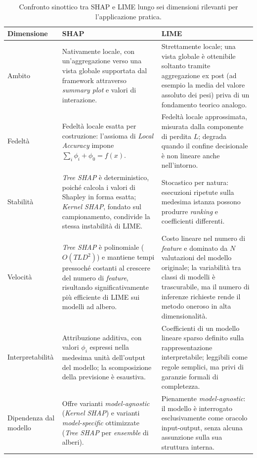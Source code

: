 \begin{table}[htbp]
\centering
\small
\caption{Confronto sinottico tra SHAP e LIME lungo sei dimensioni rilevanti per l'applicazione pratica.}
\label{tab:shap-lime}
\begin{tabular}{@{}p{2.6cm}p{5.3cm}p{5.3cm}@{}}
\toprule
\textbf{Dimensione} & \textbf{SHAP} & \textbf{LIME} \\
\midrule
Ambito & Nativamente locale, con un'aggregazione verso una vista globale supportata dal framework attraverso \textit{summary plot} e valori di interazione. & Strettamente locale; una vista globale è ottenibile soltanto tramite aggregazione ex post (ad esempio la media del valore assoluto dei pesi) priva di un fondamento teorico analogo. \\
\addlinespace
Fedeltà & Fedeltà locale esatta per costruzione: l'assioma di \textit{Local Accuracy} impone $\sum_i \phi_i + \phi_0 = f(x)$. & Fedeltà locale approssimata, misurata dalla componente di perdita $L$; degrada quando il confine decisionale è non lineare anche nell'intorno. \\
\addlinespace
Stabilità & \textit{Tree SHAP} è deterministico, poiché calcola i valori di Shapley in forma esatta; \textit{Kernel SHAP}, fondato sul campionamento, condivide la stessa instabilità di LIME. & Stocastico per natura: esecuzioni ripetute sulla medesima istanza possono produrre \textit{ranking} e coefficienti differenti. \\
\addlinespace
Velocità & \textit{Tree SHAP} è polinomiale ($O(TLD^2)$) e mantiene tempi pressoché costanti al crescere del numero di \textit{feature}, risultando significativamente più efficiente di LIME sui modelli ad albero. & Costo lineare nel numero di \textit{feature} e dominato da $N$ valutazioni del modello originale; la variabilità tra classi di modelli è trascurabile, ma il numero di inferenze richieste rende il metodo oneroso in alta dimensionalità. \\
\addlinespace
Interpretabilità & Attribuzione additiva, con valori $\phi_i$ espressi nella medesima unità dell'output del modello; la scomposizione della previsione è esaustiva. & Coefficienti di un modello lineare sparso definito sulla rappresentazione interpretabile; leggibili come regole semplici, ma privi di garanzie formali di completezza. \\
\addlinespace
Dipendenza dal modello & Offre varianti \textit{model-agnostic} (\textit{Kernel SHAP}) e varianti \textit{model-specific} ottimizzate (\textit{Tree SHAP} per \textit{ensemble} di alberi). & Pienamente \textit{model-agnostic}: il modello è interrogato esclusivamente come oracolo input-output, senza alcuna assunzione sulla sua struttura interna. \\
\bottomrule
\end{tabular}
\end{table}

